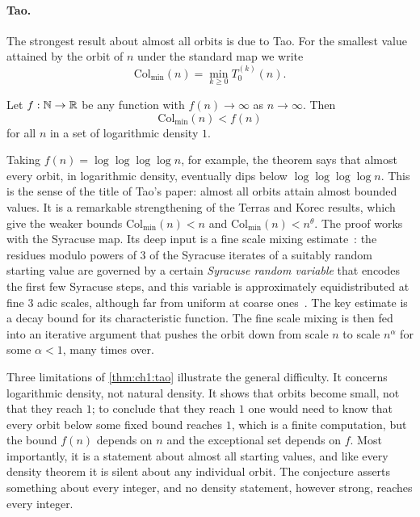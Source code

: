 \paragraph{Tao.} The strongest result about almost all orbits is due to Tao. For the smallest
value attained by the orbit of $n$ under the standard map we write
\[
  \mathrm{Col}_{\min}(n)=\min_{k\geq0}T_0^{(k)}(n).
\]

\begin{theorem}\label{thm:ch1:tao}
Let $f:\mathbb{N}\to\mathbb{R}$ be any function with $f(n)\to\infty$ as $n\to\infty$. Then
\[
  \mathrm{Col}_{\min}(n)<f(n)
\]
for all $n$ in a set of logarithmic density $1$.
\end{theorem}

Taking $f(n)=\log\log\log\log n$, for example, the theorem says that almost
every orbit, in logarithmic density, eventually dips below
$\log\log\log\log n$. This is the sense of the title of Tao's paper: almost all
orbits attain almost bounded values. It is a remarkable strengthening of the
Terras and Korec results, which give the weaker bounds
$\mathrm{Col}_{\min}(n)<n$ and
$\mathrm{Col}_{\min}(n)<n^{\theta}$. The proof works with the Syracuse map. Its
deep input is a fine scale mixing
estimate~\cite[Proposition~1.14]{tao2022}: the residues modulo powers of $3$ of the
Syracuse iterates of a suitably random starting value are governed by a certain
\emph{Syracuse random variable} that encodes the first few Syracuse steps, and
this variable is approximately equidistributed at fine $3$ adic scales,
although far from uniform at coarse ones~\cite[Remark~1.15]{tao2022}. The key
estimate is a decay bound for its characteristic function. The fine scale
mixing is then fed into an iterative argument that pushes the orbit
down from scale $n$ to scale $n^{\alpha}$ for some $\alpha<1$, many times over.

Three limitations of \cref{thm:ch1:tao} illustrate the general difficulty. It concerns logarithmic density, not
natural density. It shows that orbits become small, not that they reach $1$;
to conclude that they reach $1$ one would need to know that every orbit below
some fixed bound reaches $1$, which is a finite computation, but the bound
$f(n)$ depends on $n$ and the exceptional set depends on $f$. Most importantly,
it is a statement about almost all starting values, and like every density
theorem it is silent about any individual orbit. The conjecture asserts
something about every integer, and no density statement, however strong,
reaches every integer.

